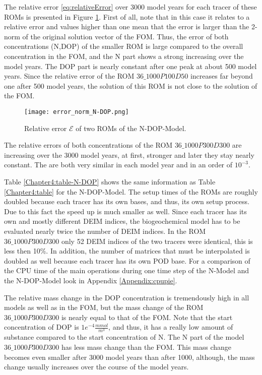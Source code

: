 The relative error \eqref{eq:relativeError} over 3000 model years for each tracer of these ROMs is presented in Figure \ref{fig:relative_error_N-DOP}.
First of all, note that in this case it relates to a relative error and values higher than one mean that the error is larger than the 
2-norm of the original solution vector of the FOM. Thus, the error of both concentrations (N,DOP) of the smaller ROM is large compared to 
the overall concentration in the FOM, and the N part shows a strong increasing over the model years. The DOP part is nearly constant after one peak at about 500 model years.
Since the relative error of the ROM $36\_1000P100D50$ increases far beyond one after 500 model years, 
the solution of this ROM is not close to the solution of the FOM.
\begin{figure}[ht]
\centering
  \texttt{[image: error\_norm\_N-DOP.png]}
  \caption{Relative error $\mathcal{E}$ of two ROMs of the N-DOP-Model.}
  \label{fig:relative_error_N-DOP}
\end{figure}
The relative errors of both concentrations of the 
ROM $36\_1000P300D300$ are increasing over the 3000 model years, at first, stronger and later they stay nearly constant. 
The are both very similar in each model year and in an order of $10^{-3}$.

Table \ref{Chapter4:table-N-DOP}
shows the same information as Table \ref{Chapter4:table} for the N-DOP-Model. The setup times of the 
ROMs are roughly doubled because each tracer has its own bases, and thus, its own setup process. Due to this fact the speed up is much smaller as well.
Since each tracer has its own and mostly different DEIM indices, the biogeochemical model has to be evaluated 
nearly twice the number of DEIM indices. In the ROM $36\_1000P300D300$ only 52 DEIM indices of the two tracers were identical, this is less then 10\%.
In addition, the number of matrices that must be interpolated is doubled as well because each tracer has its own
POD base. For a comparison of the CPU time of the main operations during one time step of the N-Model and the 
N-DOP-Model look in Appendix \ref{Appendix:cpupie}.

The relative mass change in the DOP concentration is tremendously high in all models as well as in the FOM, but the mass change of the ROM $36\_1000P300D300$ is nearly equal to that of the FOM. 
Note that the start concentration of DOP is $1e^{-4} \frac{mmol}{m^3}$, and thus, it has a really low amount of substance compared to the start concentration of N.
The N part of the model $36\_1000P300D300$ has less mass change than the FOM. This mass change becomes
even smaller after 3000 model years than after 1000, although, the mass change usually increases over the course of the model years.

